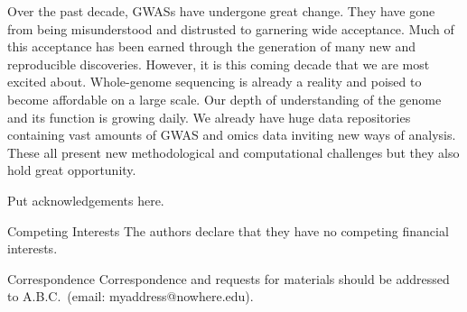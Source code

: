 \documentclass{nature}
\begin{document}
Over the past decade, GWASs have undergone great change. They have gone from being misunderstood and distrusted to garnering 
wide acceptance.  Much of this acceptance has been earned through the generation of many new and reproducible discoveries. 
However, it is this coming decade that we are most excited about. Whole-genome sequencing is already a reality and poised to become 
affordable on a large scale. Our depth of understanding of the genome and its function is growing daily.  We already have huge data repositories 
containing vast amounts of GWAS  and omics data inviting new ways of analysis. These all present new 
methodological and computational challenges but they also hold great opportunity. 
























\begin{addendum}
 \item Put acknowledgements here.
 \item[Competing Interests] The authors declare that they have no
competing financial interests.
 \item[Correspondence] Correspondence and requests for materials
should be addressed to A.B.C.~(email: myaddress@nowhere.edu).
\end{addendum}
\end{document}
